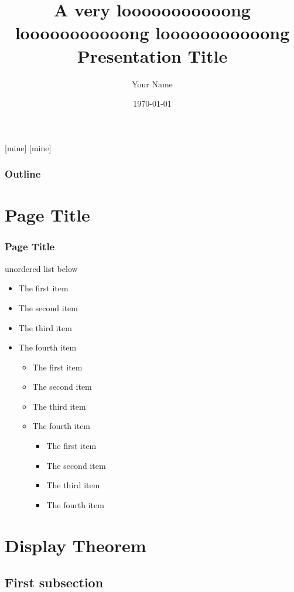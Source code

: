 \documentclass[10pt]{beamer}
\author{Your Name}
\title{A very looooooooooong  looooooooooong  looooooooooong Presentation Title}
\institute{xxx University}
\date{\today}
\begin{document}
[mine]
[mine]

\frame[plain]{\titlepage}

\begin{frame}
\frametitle{Outline}
\tableofcontents
\end{frame}

\section{Page Title}

\begin{frame}
\sectionpage
\end{frame}

\begin{frame}
\frametitle{Page Title}
unordered list below

\begin{itemize}
\item The first item
\item The second item
\item The third item
\item The fourth item
\begin{itemize}
\item The first item
\item The second item
\item The third item
\item The fourth item
\begin{itemize}
\item The first item
\item The second item
\item The third item
\item The fourth item
\end{itemize}
\end{itemize}
\end{itemize}

\end{frame}

\section{Display Theorem}


\subsection{First subsection}
\end{document}
